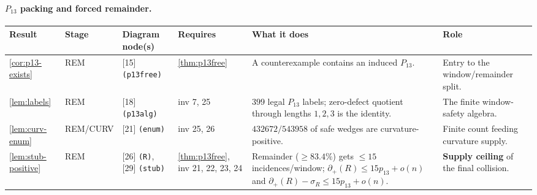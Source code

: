 \documentclass[11pt]{article}
\newcommand{\defp}{\partial_+}
\begin{document}
\paragraph{$P_{13}$ packing and forced remainder.}
{\scriptsize\setlength{\tabcolsep}{3pt}
\begin{longtable}{L{0.10\textwidth} C{0.045\textwidth} L{0.13\textwidth} L{0.135\textwidth} L{0.28\textwidth} L{0.20\textwidth}}
\toprule
\textbf{Result} & \textbf{Stage} & \textbf{Diagram node(s)} & \textbf{Requires} & \textbf{What it does} & \textbf{Role} \\
\midrule
\endhead
\cref{cor:p13-exists} & REM & [15] \texttt{(p13free)} & \cref{thm:p13free} & A counterexample contains an induced $P_{13}$. & Entry to the window/remainder split. \\
\cref{lem:labels} & REM & [18] \texttt{(p13alg)} & inv 7, 25 & $399$ legal $P_{13}$ labels; zero-defect quotient through lengths $1,2,3$ is the identity. & The finite window-safety algebra. \\
\cref{lem:curv-enum} & REM\slash CURV & [21] \texttt{(enum)} & inv 25, 26 & $432672/543958$ of safe wedges are curvature-positive. & Finite count feeding curvature supply. \\
\cref{lem:stub-positive} & REM & [26] \texttt{(R)}, [29] \texttt{(stub)} & \cref{thm:p13free}, inv 21, 22, 23, 24 & Remainder ($\ge83.4\%$) gets $\le15$ incidences/window; \(\defp(R)\le15p_{13}+o(n)\) and \(\defp(R)-\sigma_R\le15p_{13}+o(n)\). & \textbf{Supply ceiling} of the final collision. \\
\bottomrule
\end{longtable}
}
\end{document}
